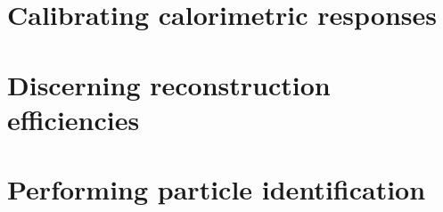 \section{Calibrating calorimetric responses}  %

\section{Discerning reconstruction efficiencies} \label{sec:SimRecoEffic} %

\section{Performing particle identification}  %

